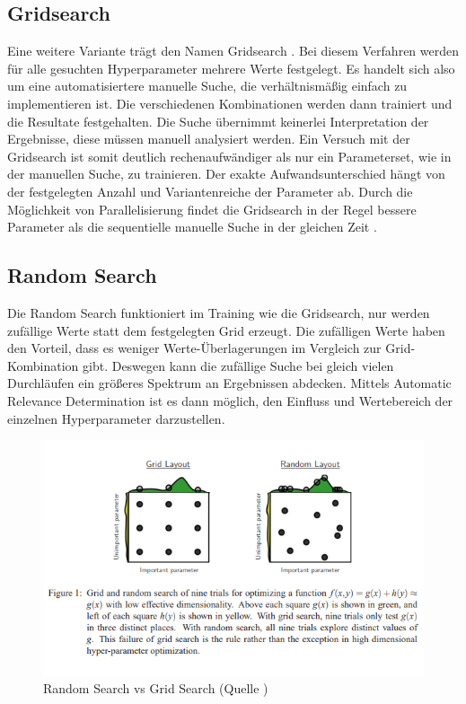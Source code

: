 \subsection{Gridsearch}
Eine weitere Variante trägt den Namen Gridsearch \cite{hyperparameters-grid-search}.
Bei diesem Verfahren werden für alle gesuchten Hyperparameter mehrere Werte festgelegt.
Es handelt sich also um eine automatisiertere manuelle Suche, die verhältnismäßig einfach zu implementieren ist.
Die verschiedenen Kombinationen werden dann trainiert und die Resultate festgehalten.
Die Suche übernimmt keinerlei Interpretation der Ergebnisse, diese müssen manuell analysiert werden.
Ein Versuch mit der Gridsearch ist somit deutlich rechenaufwändiger als nur ein Parameterset, wie in der manuellen Suche, zu trainieren.
Der exakte Aufwandsunterschied hängt von der festgelegten Anzahl und Variantenreiche der Parameter ab.
Durch die Möglichkeit von Parallelisierung findet die Gridsearch in der Regel bessere Parameter als die sequentielle manuelle Suche in der gleichen Zeit \cite{hyperparameters-random-search}.

\subsection{Random Search}
Die Random Search \cite{hyperparameters-random-search} funktioniert im Training wie die Gridsearch, nur werden zufällige Werte statt dem festgelegten Grid erzeugt.
Die zufälligen Werte haben den Vorteil, dass es weniger Werte-Überlagerungen im Vergleich zur Grid-Kombination gibt.
Deswegen kann die zufällige Suche bei gleich vielen Durchläufen ein größeres Spektrum an Ergebnissen abdecken.
Mittels Automatic Relevance Determination ist es dann möglich, den Einfluss und Wertebereich der einzelnen Hyperparameter darzustellen.

\begin{figure}[H]
	\includegraphics{kapitel/2_stand_der_technik/img/random-vs-grid-search.png}
	\caption{Random Search vs Grid Search (Quelle \cite{hyperparameters-random-search})}
\end{figure}

